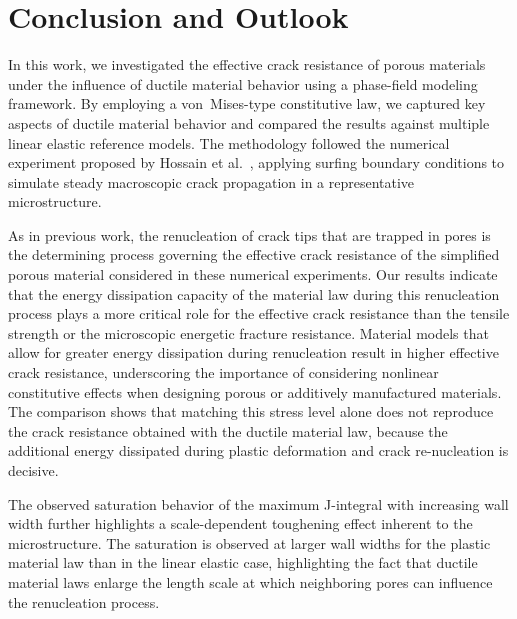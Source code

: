 \documentclass[pdflatex,sn-mathphys-num]{sn-jnl}%
\theoremstyle{thmstyleone}%
\theoremstyle{thmstyletwo}%
\theoremstyle{thmstylethree}%
\begin{document}


\section{Conclusion and Outlook}

In this work, we investigated the effective crack resistance of porous materials under the
influence of ductile material behavior using a phase-field modeling framework. By employing a
von~Mises-type constitutive law, we captured key aspects of ductile material behavior and
compared the results against multiple linear elastic reference models. The methodology followed
the numerical experiment proposed by Hossain et al.~\cite{hossain_effective_2014}, applying
surfing boundary conditions to simulate steady macroscopic crack propagation in a representative
microstructure.

As in previous work, the renucleation of crack tips that are trapped in pores is the determining
process governing the effective crack resistance of the simplified porous material considered in these numerical experiments. Our results indicate that the
energy dissipation capacity of the material law during this renucleation process plays a more
critical role for the effective crack resistance than the tensile strength or the microscopic
energetic fracture resistance. Material models that allow for greater energy dissipation during
renucleation result in higher effective crack resistance, underscoring the importance of considering
nonlinear constitutive effects when designing porous or additively manufactured materials.
The comparison shows that matching this stress level alone does not reproduce the crack resistance obtained with the ductile material law, because the additional energy dissipated during plastic deformation and crack re-nucleation is decisive.

The observed saturation behavior of the maximum J-integral with increasing wall width further
highlights a scale-dependent toughening effect inherent to the microstructure. The saturation is
observed at larger wall widths for the plastic material law than in the linear elastic case,
highlighting the fact that ductile material laws enlarge the length scale at which neighboring pores
can influence the renucleation process.
\end{document}
